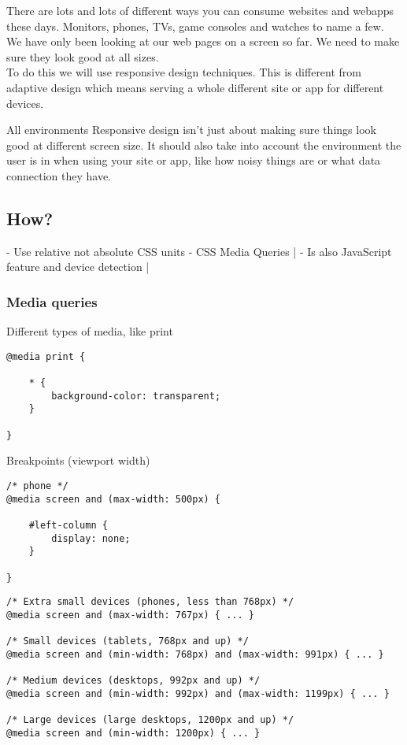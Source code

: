 There are lots and lots of different ways you can consume websites and webapps these days. Monitors, phones, TVs, game consoles and watches to name a few.
\\
We have only been looking at our web pages on a screen so far. We need to make sure they look good at all sizes.
\\
To do this we will use responsive design techniques. This is different from adaptive design which means serving a whole different site or app for different devices.

\begin{infobox}{All environments}
    Responsive design isn't just about making sure things look good at different screen size. It should also take into account the environment the user is in when using your site or app, like how noisy things are or what data connection they have.
\end{infobox}

\subsection{How?}

- Use relative not absolute CSS units
- CSS Media Queries |
- Is also JavaScript feature and device detection |


\subsubsection{Media queries}

Different types of media, like print

\begin{verbatim}
@media print {

	* {
		background-color: transparent;
	}

}
\end{verbatim}

Breakpoints (viewport width)

\begin{verbatim}
/* phone */
@media screen and (max-width: 500px) {

	#left-column {
		display: none;
	}

}
\end{verbatim}


\begin{verbatim}
/* Extra small devices (phones, less than 768px) */
@media screen and (max-width: 767px) { ... }

/* Small devices (tablets, 768px and up) */
@media screen and (min-width: 768px) and (max-width: 991px) { ... }

/* Medium devices (desktops, 992px and up) */
@media screen and (min-width: 992px) and (max-width: 1199px) { ... }

/* Large devices (large desktops, 1200px and up) */
@media screen and (min-width: 1200px) { ... }
\end{verbatim}


